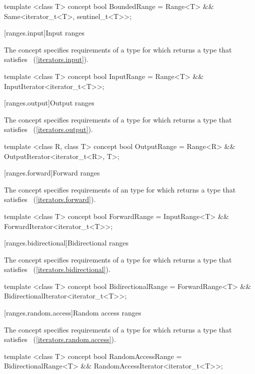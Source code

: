 \begin{codeblock}
template <class T>
concept bool BoundedRange =
  Range<T> && Same<iterator_t<T>, sentinel_t<T>>;
\end{codeblock}

[ranges.input]{Input ranges}

\pnum
The  concept specifies requirements of
a  type for which  returns a type
that satisfies ~(\ref{iterators.input}).

\begin{codeblock}
template <class T>
concept bool InputRange =
  Range<T> && InputIterator<iterator_t<T>>;
\end{codeblock}

[ranges.output]{Output ranges}

\pnum
The  concept specifies requirements of
a  type for which  returns a type that satisfies
~(\ref{iterators.output}).

\begin{codeblock}
template <class R, class T>
concept bool OutputRange =
  Range<R> && OutputIterator<iterator_t<R>, T>;
\end{codeblock}

[ranges.forward]{Forward ranges}

\pnum
The  concept specifies requirements of an
 type for which  returns a type that satisfies
~(\ref{iterators.forward}).

\begin{codeblock}
template <class T>
concept bool ForwardRange =
  InputRange<T> && ForwardIterator<iterator_t<T>>;
\end{codeblock}

[ranges.bidirectional]{Bidirectional ranges}

\pnum
The  concept specifies requirements of a
 type for which  returns a type that satisfies
~(\ref{iterators.bidirectional}).

\begin{codeblock}
template <class T>
concept bool BidirectionalRange =
  ForwardRange<T> && BidirectionalIterator<iterator_t<T>>;
\end{codeblock}

[ranges.random.access]{Random access ranges}

\pnum
The  concept specifies requirements of a
 type for which  returns a type that satisfies
~(\ref{iterators.random.access}).

\begin{codeblock}
template <class T>
concept bool RandomAccessRange =
  BidirectionalRange<T> && RandomAccessIterator<iterator_t<T>>;
\end{codeblock}
